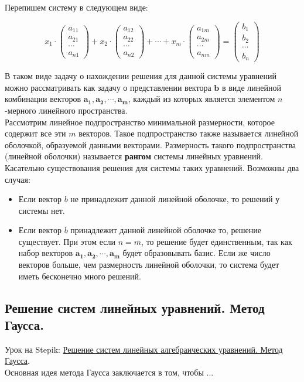 \documentclass{article}
\begin{document}
Перепишем систему в следующем виде:

\[
	x_1 \cdot \begin{pmatrix} a_{11} \\ a_{21} \\ \cdots \\ a_{n1} \end{pmatrix} + 
	x_2 \cdot \begin{pmatrix} a_{12} \\ a_{22} \\ \cdots \\ a_{n2} \end{pmatrix} +
	\cdots +
	x_m \cdot \begin{pmatrix} a_{1m} \\ a_{2m} \\ \cdots \\ a_{nm} \end{pmatrix} =
	\begin{pmatrix} b_1 \\ b_2 \\ \cdots\\  b_n \end{pmatrix} 
\]

В таком виде задачу о нахождении решения для данной системы уравнений можно рассматривать как задачу о представлении вектора $\mathbf{b}$ в виде линейной комбинации векторов $\mathbf{a_1}, \mathbf{a_2}, \cdots, \mathbf{a_m}$, каждый из которых является элементом $n$-мерного линейного пространства. \\

Рассмотрим линейное подпространство минимальной размерности, которое содержит все эти $m$ векторов. Такое подпространство также называется линейной оболочкой, образуемой данными векторами. Размерность такого подпространства (линейной оболочки) называется \textbf{рангом} системы линейных уравнений. \\

Касательно существования решения для системы таких уравнений. Возможны два случая: 

\begin{itemize}
	\item Если вектор $b$ не принадлежит данной линейной оболочке, то решений у системы нет.
	\item Если вектор $b$ принадлежит данной линейной оболочке то, решение существует. При этом если $n = m$, то решение будет единственным, так как набор векторов $\mathbf{a_1}, \mathbf{a_2}, \cdots, \mathbf{a_m}$ будет образовывать базис. Если же число векторов больше, чем размерность линейной оболочки, то система будет иметь бесконечно много решений.
\end{itemize}

\subsection{Решение систем линейных уравнений. Метод Гаусса.}

Урок на Stepik: \href{https://stepik.org/lesson/9582/step/1?unit=23533}{Решение систем линейных алгебраических уравнений. Метод Гаусса}. \\

Основная идея метода Гаусса заключается в том, чтобы ...
\end{document}

